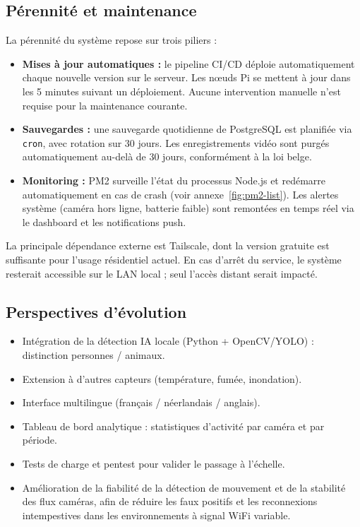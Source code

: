 \documentclass[12pt,a4paper]{article}
\begin{document}
\subsection{Pérennité et maintenance}

La pérennité du système repose sur trois piliers :

\begin{itemize}[label=\textbullet]
    \item \textbf{Mises à jour automatiques :} le pipeline CI/CD déploie automatiquement chaque nouvelle version sur le serveur. Les nœuds Pi se mettent à jour dans les 5 minutes suivant un déploiement. Aucune intervention manuelle n'est requise pour la maintenance courante.
    \item \textbf{Sauvegardes :} une sauvegarde quotidienne de PostgreSQL est planifiée via \texttt{cron}, avec rotation sur 30 jours. Les enregistrements vidéo sont purgés automatiquement au-delà de 30 jours, conformément à la loi belge.
    \item \textbf{Monitoring :} PM2 surveille l'état du processus Node.js et redémarre automatiquement en cas de crash (voir annexe~\ref{fig:pm2-list}). Les alertes système (caméra hors ligne, batterie faible) sont remontées en temps réel via le dashboard et les notifications push.
\end{itemize}

La principale dépendance externe est Tailscale, dont la version gratuite est suffisante pour l'usage résidentiel actuel. En cas d'arrêt du service, le système resterait accessible sur le LAN local ; seul l'accès distant serait impacté.

\subsection{Perspectives d'évolution}

\begin{itemize}[label=\textbullet]
    \item Intégration de la détection IA locale (Python + OpenCV/YOLO) : distinction personnes / animaux.
    \item Extension à d'autres capteurs (température, fumée, inondation).
    \item Interface multilingue (français / néerlandais / anglais).
    \item Tableau de bord analytique : statistiques d'activité par caméra et par période.
    \item Tests de charge et pentest pour valider le passage à l'échelle.
    \item Amélioration de la fiabilité de la détection de mouvement et de la stabilité des flux caméras, afin de réduire les faux positifs et les reconnexions intempestives dans les environnements à signal WiFi variable.
\end{itemize}
\end{document}
